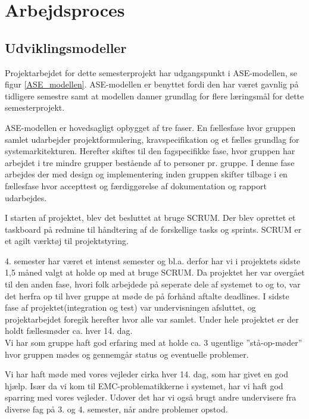 
\chapter{Arbejdsproces}
\label{arbejdsproces}
\section{Udviklingsmodeller}

Projektarbejdet for dette semesterprojekt har udgangspunkt i ASE-modellen, se figur \ref{ASE_modellen}. ASE-modellen er benyttet fordi den har været gavnlig på tidligere semestre samt at modellen danner grundlag for flere læringsmål for dette semesterprojekt.

ASE-modellen er hovedsagligt opbygget af tre faser. En fællesfase hvor gruppen samlet udarbejder projektformulering, kravspecifikation og et fælles grundlag for systemarkitekturen. Herefter skiftes til den fagspecifikke fase, hvor gruppen har arbejdet i tre mindre grupper bestående af to personer pr. gruppe. I denne fase arbejdes der med design og implementering inden gruppen skifter tilbage i en fællesfase hvor accepttest og færdiggørelse af dokumentation og rapport udarbejdes. 


I starten af projektet, blev det besluttet at bruge SCRUM\citep{website:scrum}. Der blev oprettet et taskboard på redmine til håndtering af de forskellige tasks og sprints. SCRUM er et agilt værktøj til projektstyring. 

4. semester har været et intenst semester og bl.a. derfor har vi i projektets sidste 1,5 måned valgt at holde op med at bruge SCRUM. Da projektet her var overgået til den anden fase, hvori folk arbejdede på seperate dele af systemet to og to, var det herfra op til hver gruppe at møde de på forhånd aftalte deadlines. I sidste fase af projektet(integration og test) var undervisningen afsluttet, og projektarbejdet foregik herefter hvor alle var samlet. Under hele projektet er der holdt fællesmøder ca. hver 14. dag.\\
Vi har som gruppe haft god erfaring med at holde ca. 3 ugentlige ''stå-op-møder'' hvor gruppen mødes og gennemgår status og eventuelle problemer.

Vi har haft møde med vores vejleder cirka hver 14. dag, som har givet en god hjælp. Især da vi kom til EMC-problematikkerne i systemet, har vi haft god sparring med vores vejleder. Udover det har vi også brugt andre undervisere fra diverse fag på 3. og 4. semester, når andre problemer opstod.

